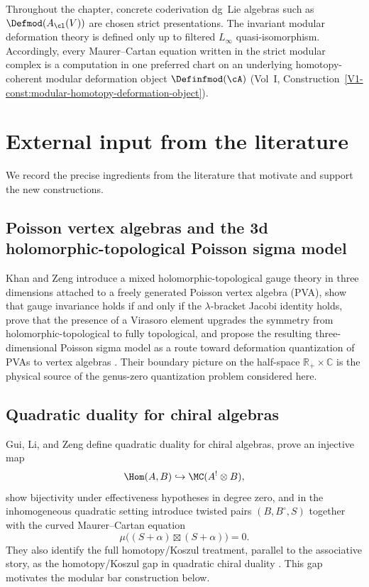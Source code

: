 \begin{convention}
\label{conv:modular-pva-strict-versus-homotopy}
Throughout the chapter, concrete coderivation dg~Lie algebras such as
$\Defmod(A_{\cl}(V))$ are chosen strict presentations. The invariant
modular deformation theory is defined only up to filtered
$L_\infty$ quasi-isomorphism. Accordingly, every Maurer--Cartan equation
written in the strict modular complex is a computation in
one preferred chart on an underlying homotopy-coherent modular
deformation object $\Definfmod(\cA)$
(Vol~I, Construction~\ref*{V1-const:modular-homotopy-deformation-object}).
\end{convention}

\section{External input from the literature}

We record the precise ingredients from the literature that motivate and support the
new constructions.

\subsection{Poisson vertex algebras and the 3d holomorphic-topological Poisson sigma model}

Khan and Zeng introduce a mixed holomorphic-topological gauge theory in three dimensions
attached to a freely generated Poisson vertex algebra (PVA), show that gauge invariance
holds if and only if the $\lambda$-bracket Jacobi identity holds, prove that the presence
of a Virasoro element upgrades the symmetry from holomorphic-topological to fully
topological, and propose the resulting three-dimensional Poisson sigma model as a route
toward deformation quantization of PVAs to vertex algebras \cite{KZ25}. Their
boundary picture on the half-space $\mathbb R_+\times \mathbb C$ is the physical source of
the genus-zero quantization problem considered here.

\subsection{Quadratic duality for chiral algebras}

Gui, Li, and Zeng define quadratic duality for chiral algebras, prove an injective map
\[
\Hom(A,B)\hookrightarrow \MC(A^!\otimes B),
\]
show bijectivity under effectiveness hypotheses in degree zero, and in the inhomogeneous
quadratic setting introduce twisted pairs $(B,B^\circ,S)$ together with the curved
Maurer--Cartan equation
\[
\mu\big((S+\alpha)\boxtimes (S+\alpha)\big)=0.
\]
They also identify the full homotopy/Koszul treatment, parallel to the
associative story, as the homotopy/Koszul gap in quadratic chiral duality
\cite{GLZ22}. This gap motivates the modular bar construction below.

